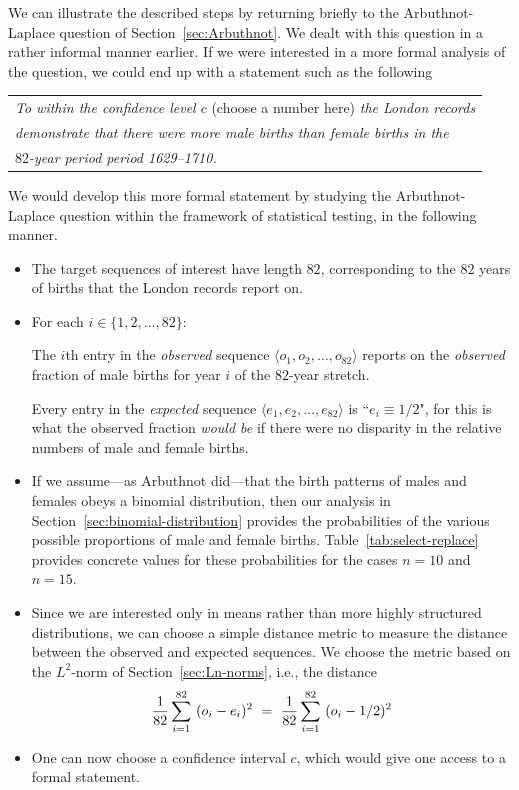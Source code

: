We can illustrate the described steps by returning briefly to the Arbuthnot-Laplace question of Section~\ref{sec:Arbuthnot}.   We dealt with this question in a rather informal manner earlier.  If we were interested in a more formal analysis of the question, we could end up with a statement such as the following

\begin{tabular}{l}
{\em To within the confidence level $c$} (choose a number here) {\em the London records} \\
{\em demonstrate that there were more male births than female births in the} \\
{\em $82$-year period period 1629--1710.}
\end{tabular}

\noindent
We would develop this more formal statement by studying the Arbuthnot-Laplace question within the framework of statistical testing, in the following manner.
\begin{itemize}
\item
The target sequences of interest have length $82$, corresponding to the $82$ years of births that the London records report on. 
\item
For each $i \in \{1,2, \ldots, 82\}$:

\smallskip

The $i$th entry in the {\em observed} sequence $\langle o_1, o_2, \ldots, o_{82} \rangle$ reports on the {\em observed} fraction of male births for year $i$ of the $82$-year stretch.

\smallskip

Every entry in the {\em expected} sequence $\langle e_1, e_2, \ldots, e_{82} \rangle$ is ``$e_i \equiv 1/2$", for this is what the observed fraction {\em would be} if there were no disparity in the relative numbers of male and female births.

\item
If we assume---as Arbuthnot did---that the birth patterns of males and females obeys a binomial distribution, then our analysis in Section~\ref{sec:binomial-distribution} provides the probabilities of the various possible proportions of male and female births.  Table~\ref{tab:select-replace} provides concrete values for these probabilities for the cases $n=10$ and $n=15$.

\item
Since we are interested only in means rather than more highly structured distributions, we can choose a simple distance metric to measure the distance between the observed and expected sequences.  We choose the metric based on the $L^2$-norm of Section~\ref{sec:Ln-norms}, i.e., the distance
\[ {1 \over 82} \sum_{i=1}^{82} \ (o_i -e_i)^2 \ = \ {1 \over 82} \sum_{i=1}^{82} \ (o_i - 1/2)^2 \]

\item
One can now choose a confidence interval $c$, which would give one access to a formal statement.
\end{itemize}

